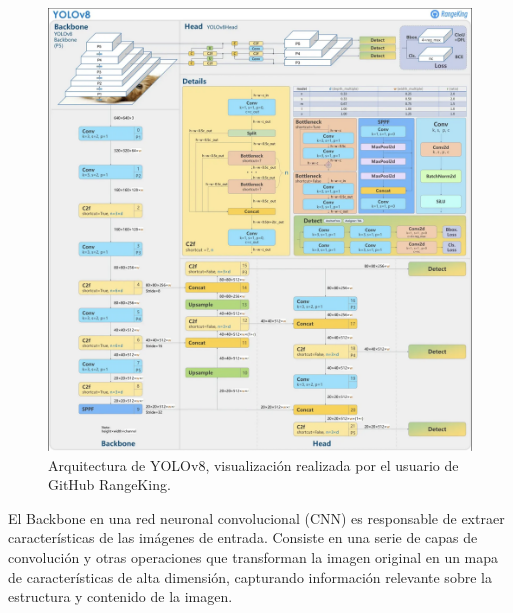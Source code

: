 \begin{figure}[H]
    \centering
    \includegraphics[width=1\textwidth]{../img/yolov8-arq.png}
    \caption{Arquitectura de YOLOv8, visualización realizada por el usuario de GitHub RangeKing\cite{RangeKing_GitHub}.}
    \label{fig:YOLOv8_architecture}
\end{figure}

El Backbone en una red neuronal convolucional (CNN) es responsable de extraer características de las imágenes de entrada. Consiste en una serie de capas de convolución y otras operaciones que transforman la imagen original en un mapa de características de alta dimensión, capturando información relevante sobre la estructura y contenido de la imagen.

